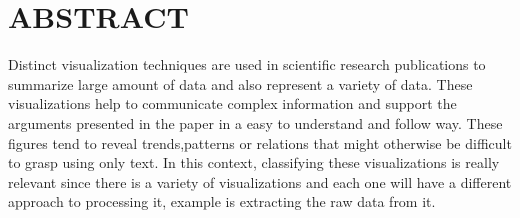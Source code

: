 \documentclass[12pt, a4paper,oneside]{report}
\begin{document}


\setcounter{tocdepth}{10}
\tableofcontents





\listoffigures
\listoftables

\titleformat{\chapter}{\LARGE\bfseries}{\thechapter}{1em}{}

\newpage
\chapter{ABSTRACT}
Distinct visualization techniques are used in scientific research publications to summarize large amount of data and also represent a variety of data. These visualizations help to communicate complex information and support the arguments presented in the paper in a easy to understand and follow way.
These figures tend to reveal trends,patterns or relations that might otherwise be difficult to grasp using only text. In this context, classifying these visualizations is really relevant since there is a variety of visualizations and each one will have a different approach to processing it, example is extracting the raw data from it. 
\end{document}
